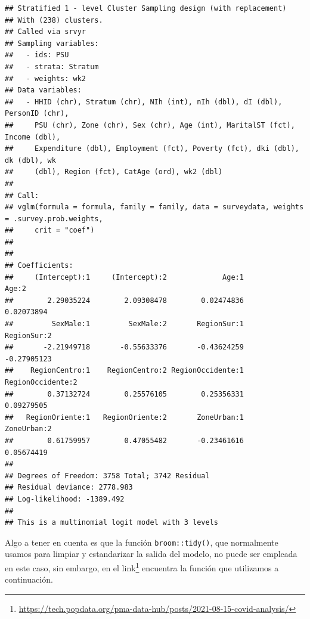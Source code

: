\documentclass[
  12pt,
]{book}
\begin{document}
\begin{verbatim}
## Stratified 1 - level Cluster Sampling design (with replacement)
## With (238) clusters.
## Called via srvyr
## Sampling variables:
##   - ids: PSU 
##   - strata: Stratum 
##   - weights: wk2 
## Data variables: 
##   - HHID (chr), Stratum (chr), NIh (int), nIh (dbl), dI (dbl), PersonID (chr),
##     PSU (chr), Zone (chr), Sex (chr), Age (int), MaritalST (fct), Income (dbl),
##     Expenditure (dbl), Employment (fct), Poverty (fct), dki (dbl), dk (dbl), wk
##     (dbl), Region (fct), CatAge (ord), wk2 (dbl)
## 
## Call:
## vglm(formula = formula, family = family, data = surveydata, weights = .survey.prob.weights, 
##     crit = "coef")
## 
## 
## Coefficients:
##     (Intercept):1     (Intercept):2             Age:1             Age:2 
##        2.29035224        2.09308478        0.02474836        0.02073894 
##         SexMale:1         SexMale:2       RegionSur:1       RegionSur:2 
##       -2.21949718       -0.55633376       -0.43624259       -0.27905123 
##    RegionCentro:1    RegionCentro:2 RegionOccidente:1 RegionOccidente:2 
##        0.37132724        0.25576105        0.25356331        0.09279505 
##   RegionOriente:1   RegionOriente:2       ZoneUrban:1       ZoneUrban:2 
##        0.61759957        0.47055482       -0.23461616        0.05674419 
## 
## Degrees of Freedom: 3758 Total; 3742 Residual
## Residual deviance: 2778.983 
## Log-likelihood: -1389.492 
## 
## This is a multinomial logit model with 3 levels
\end{verbatim}

Algo a tener en cuenta es que la función \texttt{broom::tidy()}, que normalmente usamos para limpiar y estandarizar la salida del modelo, no puede ser empleada en este caso, sin embargo, en el link\footnote{\url{https://tech.popdata.org/pma-data-hub/posts/2021-08-15-covid-analysis/}} encuentra la función que utilizamos a continuación.
\end{document}
